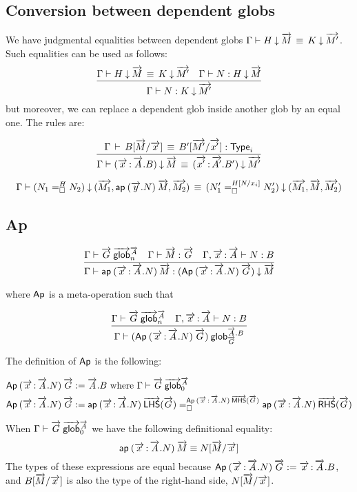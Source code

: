 \subsection{Conversion between dependent globs}

We have judgmental equalities between dependent globs
$\deqdepglob{\Gamma}H{\tel{M}}K{\tel{M'}}$. Such equalities can be used as
follows:
\[
\infer
  {\ofdepglob{\Gamma}{N}{K}{\tel{M'}}}
  {\deqdepglob{\Gamma}H{\tel{M}}K{\tel{M'}}
  &\ofdepglob{\Gamma}{N}{H}{\tel{M}}}
\]
but moreover, we can replace a dependent glob inside another glob by an equal
one. The rules are:

\[
\infer
  {\deqdepglob{\Gamma}{(\teltm xA.B)}{\tel{M}}
   {(\teltm{x'}{A'}.B')}{\tel{M'}}}
  {\deqtype{\Gamma}{B[\tel{M}/\tel{x}]}{B'[\tel{M'}/\tel{x'}]}}
\]

\[
\deqdepglob{\Gamma}
  {(\dhomj{H}{N_1}{N_2}{\blank})}
  {(\tel{M_1},\ap{(\tel y.N)}{\tel M},\tel{M_2})}
  {(\dhomj{H[N/x_i]}{N_1'}{N_2'}{\blank})}
  {(\tel{M_1},\tel M,\tel{M_2})}
\]



\subsection{Ap}

\[\infer{\ofdepglob{\Gamma}{\ap{(\teltm xA.N)}{\tel M}}
  {(\Ap{(\teltm xA.N)}{\tel G})}{\tel M}}
{\wfglob{\Gamma}{\tel G}{\tel A}n
  & \ofglob{\Gamma}{\tel M}{\tel G}
  & \ofglob{\Gamma,\teltm xA}{N}{B}}\]

where $\dsd{Ap}$ is a meta-operation such that

\[\infer{\wfdepglob{\Gamma}{(\Ap{(\teltm xA.N)}{\tel G})}
  {\tel A.B}{\tel G}}
{\wfglob{\Gamma}{\tel G}{\tel A}n
  & \ofglob{\Gamma,\teltm xA}{N}{B}}\]

The definition of $\dsd{Ap}$ is the following:

\[\begin{aligned}
\Ap{(\teltm xA.N)}{\tel G} & := \tel A.B
\text{ where $\wfglob{\Gamma}{\tel G}{\tel A}0$} \\
\Ap{(\teltm xA.N)}{\tel G} & := 
  \dhomj
    {\Ap{(\teltm xA.N)}{\mhs{\tel G}}}
    {\ap{(\teltm xA.N)}{\lhs{\tel G}}}
    {\ap{(\teltm xA.N)}{\rhs{\tel G}}}{\blank}
\end{aligned}\]

When $\wfglob{\Gamma}{\tel G}{\tel A}0$ we have the following definitional
equality:
\[ \ap{(\teltm xA.N)}{\tel M} \equiv N[\tel M/\tel x] \]
The types of these expressions are equal because
$\Ap{(\teltm xA.N)}{\tel G} := \teltm xA.B$,
and $B[\tel M/\tel x]$ is also the type of the right-hand side, $N[\tel M/\tel
x]$.

